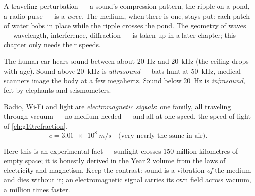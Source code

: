 \begin{definition}[Wave]\label{def:g10:signals-and-waves:wave}
A traveling perturbation --- a sound's compression pattern, the ripple
on a pond, a radio pulse --- is a \emph{wave}. The medium,
when there is one, stays put: each patch of water bobs in place while
the ripple crosses the pond. The geometry of waves --- wavelength,
interference, diffraction --- is taken up in a later chapter; this
chapter only needs their speeds.
\end{definition}

\begin{definition}\label{def:g10:signals-and-waves:ultrasound}
The human ear hears sound between about \qty{20}{Hz} and \qty{20}{kHz}
(the ceiling drops with age). Sound above \qty{20}{kHz} is
\emph{ultrasound} --- bats hunt at \qty{50}{kHz},
medical scanners image the body at a few megahertz. Sound below
\qty{20}{Hz} is \emph{infrasound}, felt by elephants
and seismometers.
\end{definition}

\begin{proposition}\label{prop:g10:signals-and-waves:em}
Radio, Wi-Fi and light are \emph{electromagnetic
signals}: one family, all traveling
through vacuum --- no medium needed --- and all at one speed, the speed
of light of \cref{ch:g10:refraction},
\[
c = \qty{3.00e8}{m/s} \quad \text{(very nearly the same in air).}
\]
\end{proposition}
\admitted

\begin{remark}\label{rem:g10:signals-and-waves:honest}
Here this is an experimental fact --- sunlight crosses $150$ million
kilometres of empty space; it is honestly derived in the Year 2 volume
from the laws of electricity and magnetism. Keep the contrast: sound is
a vibration \emph{of} the medium and dies without it; an electromagnetic
signal carries its own field across vacuum, a million times faster.
\end{remark}

